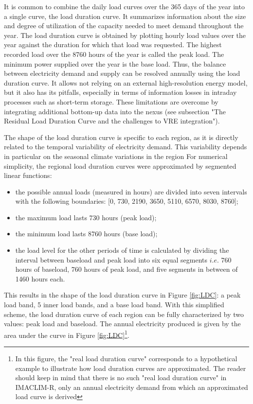 It is common to combine the daily load curves over the 365 days of the year into a single curve, the load duration curve. It summarizes information about the size and degree of utilization of the capacity needed to meet demand throughout the year.
The load duration curve is obtained by plotting hourly load values over the year against the duration for which that load was requested. The highest recorded load over the 8760 hours of the year is called the peak load. The minimum power supplied over the year is the base load. Thus, the balance between electricity demand and supply can be resolved annually using the load duration curve. It allows not relying on an external high-resolution energy model, but it also has its pitfalls, especially in terms of information losses in intraday processes such as short-term storage. These limitations are overcome by integrating additional bottom-up data into the nexus (see subsection "The Residual Load Duration Curve and the challenges to VRE integration").

The shape of the load duration curve is specific to each region, as it is directly related to the temporal variability of electricity demand. This variability depends in particular on the seasonal climate variations in the region
For numerical simplicity, the regional load duration curves were approximated by segmented linear functions:
\begin{itemize}
    \item the possible annual loads (measured in hours) are divided into seven intervals with the following boundaries: [0, 730, 2190, 3650, 5110, 6570, 8030, 8760];
    \item the maximum load lasts 730 hours (peak load);
    \item the minimum load lasts 8760 hours (base load);
    \item the load level for the other periods of time is calculated by dividing the interval between baseload and peak load into six equal segments $i.e.$ 760 hours of baseload, 760 hours of peak load, and five segments in between of 1460 hours each.
\end{itemize}

This results in the shape of the load duration curve in Figure \ref{fig:LDC}: a peak load band, 5 inner load bands, and a base load band.
With this simplified scheme, the load duration curve of each region can be fully characterized by two values: peak load and baseload. The annual electricity produced is given by the area under the curve in Figure \ref{fig:LDC}\footnote{In this figure, the "real load duration curve" corresponds to a hypothetical example to illustrate how load duration curves are approximated. The reader should keep in mind that there is no such "real load duration curve" in IMACLIM-R, only an annual electricity demand from which an approximated load curve is derived}.

